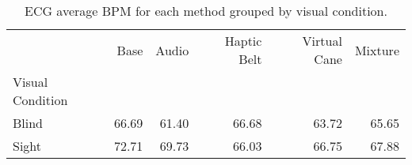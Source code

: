 
\begin{table}[!htb]
\centering
\caption{ECG average BPM for each method grouped by visual condition.}
\label{tab:bpm_average_group [BPM]}
\begin{tabular}{lrrrrr}
\toprule
{} &   Base &  Audio & Haptic Belt & Virtual Cane & Mixture \\
Visual Condition &        &        &             &              &         \\
\midrule
Blind            &  66.69 &  61.40 &       66.68 &        63.72 &   65.65 \\
Sight            &  72.71 &  69.73 &       66.03 &        66.75 &   67.88 \\
\bottomrule
\end{tabular}
\end{table}

